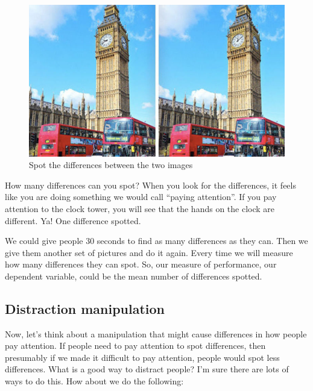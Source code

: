 \documentclass[
]{book}
\begin{document}
\begin{figure}
\centering
\includegraphics{figures/spot_dif.png}
\caption{\label{fig:9spotdiff}Spot the differences between the two images}
\end{figure}

How many differences can you spot? When you look for the differences, it feels like you are doing something we would call ``paying attention''. If you pay attention to the clock tower, you will see that the hands on the clock are different. Ya! One difference spotted.

We could give people 30 seconds to find as many differences as they can. Then we give them another set of pictures and do it again. Every time we will measure how many differences they can spot. So, our measure of performance, our dependent variable, could be the mean number of differences spotted.

\hypertarget{distraction-manipulation}{%
\subsection{Distraction manipulation}\label{distraction-manipulation}}

Now, let's think about a manipulation that might cause differences in how people pay attention. If people need to pay attention to spot differences, then presumably if we made it difficult to pay attention, people would spot less differences. What is a good way to distract people? I'm sure there are lots of ways to do this. How about we do the following:
\end{document}
